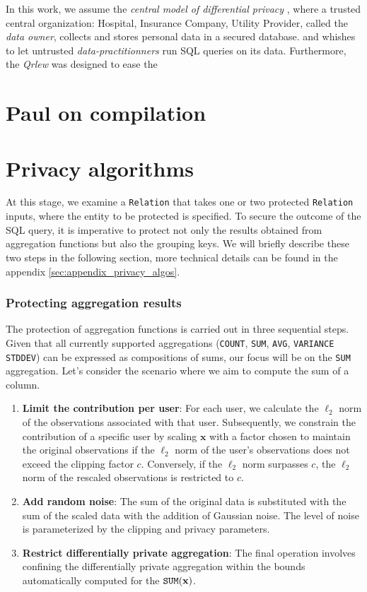 \documentclass[letterpaper]{article} %
\newcommand{\qrlew}{\emph{Qrlew}}
\begin{document}
In this work, we assume the \emph{central model of differential privacy} \cite{near2020threat}, where a trusted central organization: Hospital, Insurance Company, Utility Provider, called the \emph{data owner}, collects and stores personal data in a secured database. and whishes to let untrusted \emph{data-practitionners} run SQL queries on its data.
Furthermore, the
\qrlew{} was designed to ease the

\section{Paul on compilation}

\section{Privacy algorithms}
\label{sec:privacy_algos}

At this stage, we examine a \texttt{Relation} that takes one or two protected \texttt{Relation} inputs, where the entity to be protected is specified.
To secure the outcome of the SQL query, it is imperative to protect not only the results obtained from aggregation functions but also the grouping keys.
We will briefly describe these two steps in the following section, more technical details can be found in the appendix \ref{sec:appendix_privacy_algos}.

\subsubsection{Protecting aggregation results}

The protection of aggregation functions is carried out in three sequential steps. Given that all currently supported aggregations (\texttt{COUNT}, \texttt{SUM}, \texttt{AVG}, \texttt{VARIANCE} \texttt{STDDEV}) can be expressed as compositions of sums, our focus will be on the \texttt{SUM} aggregation. Let's consider the scenario where we aim to compute the sum of a column.

\begin{enumerate}
	\item \textbf{Limit the contribution per user}:
	For each user, we calculate the $\ell_2$ norm of the observations associated with that user. Subsequently, we constrain the contribution of a specific user by scaling $\textbf{x}$ with a factor chosen to maintain the original observations if the $\ell_2$ norm of the user's observations does not exceed the clipping factor $c$. Conversely, if the $\ell_2$ norm surpasses $c$, the $\ell_2$  norm of the rescaled observations is restricted to $c$.

	\item \textbf{Add random noise}:
	The sum of the original data is substituted with the sum of the scaled data with the addition of Gaussian noise. The level of noise is parameterized by the clipping and privacy parameters.

	\item \textbf{Restrict differentially private aggregation}:
	The final operation involves confining the differentially private aggregation within the bounds automatically computed for the $\text{\texttt{SUM}}(\textbf{x})$.
\end{enumerate}
\end{document}

